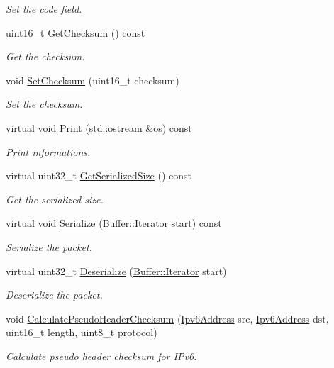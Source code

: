 \begin{DoxyCompactItemize}
\begin{DoxyCompactList}\small\item\em Set the code field. \end{DoxyCompactList}\item 
uint16\+\_\+t \hyperlink{classns3_1_1Icmpv6Header_a94c5bd0503cfd705ff2c93eb57fd1a75}{Get\+Checksum} () const 
\begin{DoxyCompactList}\small\item\em Get the checksum. \end{DoxyCompactList}\item 
void \hyperlink{classns3_1_1Icmpv6Header_ad7f81445e5c3e5eed459856184530196}{Set\+Checksum} (uint16\+\_\+t checksum)
\begin{DoxyCompactList}\small\item\em Set the checksum. \end{DoxyCompactList}\item 
virtual void \hyperlink{classns3_1_1Icmpv6Header_a1c9d9c33af71dbdef8027f696e581ca5}{Print} (std\+::ostream \&os) const 
\begin{DoxyCompactList}\small\item\em Print informations. \end{DoxyCompactList}\item 
virtual uint32\+\_\+t \hyperlink{classns3_1_1Icmpv6Header_aa2ec90815fc1ccc54632424ca3b87e96}{Get\+Serialized\+Size} () const 
\begin{DoxyCompactList}\small\item\em Get the serialized size. \end{DoxyCompactList}\item 
virtual void \hyperlink{classns3_1_1Icmpv6Header_a730861c09bbcc03f586a7b31656cbbc5}{Serialize} (\hyperlink{classns3_1_1Buffer_1_1Iterator}{Buffer\+::\+Iterator} start) const 
\begin{DoxyCompactList}\small\item\em Serialize the packet. \end{DoxyCompactList}\item 
virtual uint32\+\_\+t \hyperlink{classns3_1_1Icmpv6Header_a7507f363f31e23fb11ceb21aec6be469}{Deserialize} (\hyperlink{classns3_1_1Buffer_1_1Iterator}{Buffer\+::\+Iterator} start)
\begin{DoxyCompactList}\small\item\em Deserialize the packet. \end{DoxyCompactList}\item 
void \hyperlink{classns3_1_1Icmpv6Header_aa0598a05dad2904576ed853885f4ed40}{Calculate\+Pseudo\+Header\+Checksum} (\hyperlink{classns3_1_1Ipv6Address}{Ipv6\+Address} src, \hyperlink{classns3_1_1Ipv6Address}{Ipv6\+Address} dst, uint16\+\_\+t length, uint8\+\_\+t protocol)
\begin{DoxyCompactList}\small\item\em Calculate pseudo header checksum for I\+Pv6. \end{DoxyCompactList}\end{DoxyCompactItemize}
